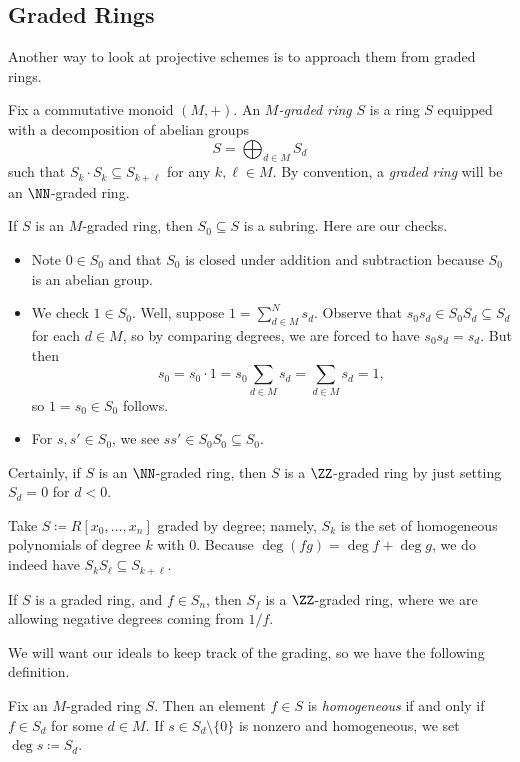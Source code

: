 \documentclass[../notes.tex]{subfiles}
\begin{document}
\subsection{Graded Rings}
Another way to look at projective schemes is to approach them from graded rings.
\begin{definition}
	Fix a commutative monoid $(M,+)$. An \textit{$M$-graded ring} $S$ is a ring $S$ equipped with a decomposition of abelian groups
	\[S=\bigoplus_{d\in M}S_d\]
	such that $S_k\cdot S_k\subseteq S_{k+\ell}$ for any $k,\ell\in M$. By convention, a \textit{graded ring} will be an $\NN$-graded ring.
\end{definition}
\begin{remark}
	If $S$ is an $M$-graded ring, then $S_0\subseteq S$ is a subring. Here are our checks.
	\begin{itemize}
		\item Note $0\in S_0$ and that $S_0$ is closed under addition and subtraction because $S_0$ is an abelian group.
		\item We check $1\in S_0$. Well, suppose $1=\sum_{d\in M}^Ns_d$. Observe that $s_0s_d\in S_0S_d\subseteq S_d$ for each $d\in M$, so by comparing degrees, we are forced to have $s_0s_d=s_d$. But then
		\[s_0=s_0\cdot1=s_0\sum_{d\in M}s_d=\sum_{d\in M}s_d=1,\]
		so $1=s_0\in S_0$ follows.
		\item For $s,s'\in S_0$, we see $ss'\in S_0S_0\subseteq S_0$.
	\end{itemize}
\end{remark}
\begin{remark}
	Certainly, if $S$ is an $\NN$-graded ring, then $S$ is a $\ZZ$-graded ring by just setting $S_d=0$ for $d<0$.
\end{remark}
\begin{example}
	Take $S\coloneqq R[x_0,\ldots,x_n]$ graded by degree; namely, $S_k$ is the set of homogeneous polynomials of degree $k$ with $0$. Because $\deg(fg)=\deg f+\deg g$, we do indeed have $S_kS_\ell\subseteq S_{k+\ell}$.
\end{example}
\begin{example}
	If $S$ is a graded ring, and $f\in S_n$, then $S_f$ is a $\ZZ$-graded ring, where we are allowing negative degrees coming from $1/f$.
\end{example}
We will want our ideals to keep track of the grading, so we have the following definition.
\begin{definition}
	Fix an $M$-graded ring $S$. Then an element $f\in S$ is \textit{homogeneous} if and only if $f\in S_d$ for some $d\in M$. If $s\in S_d\setminus\{0\}$ is nonzero and homogeneous, we set $\deg s\coloneqq S_d$.
\end{definition}
\end{document}

